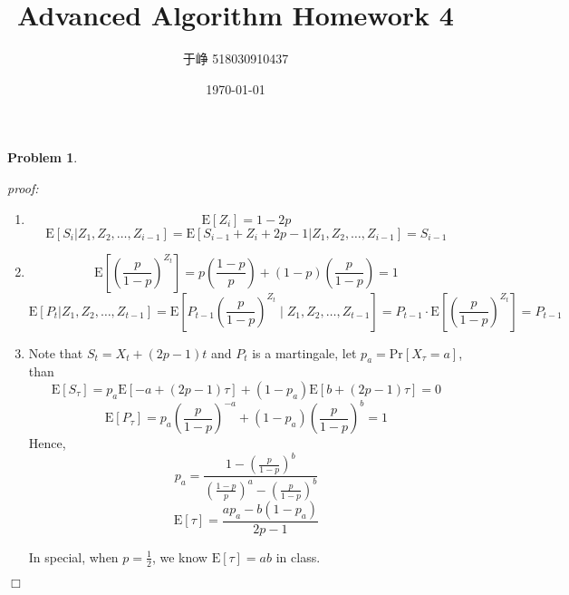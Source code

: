 \documentclass{article}
\title{Advanced Algorithm Homework 4}
\author{于峥 518030910437}
\date{\today}
\newtheorem{problem}[theorem]{Problem}
\newenvironment{solution}{\noindent \textit{proof:}}{$\Box$}
\begin{document}
    \maketitle
    
\begin{problem}
\end{problem}
\begin{solution}
    \begin{enumerate}[1.]
        \item 
        $$
        \mathrm{E}[Z_i] = 1 - 2p
        $$
        $$
        \mathrm{E}[S_i|Z_1,Z_2,\dots,Z_{i-1}] = \mathrm{E}[S_{i-1}+Z_i+2p-1|Z_1,Z_2,\dots,Z_{i-1}]=S_{i-1}
        $$
        \item
        $$
        \mathrm{E}\left[\left(\frac p {1-p}\right)^{Z_t}\right] = 
        p(\frac {1-p} {p}) + (1-p)(\frac {p} {1-p}) = 1
        $$
        $$
        \mathrm{E}[P_t|Z_1,Z_2,\dots,Z_{t-1}]=\mathrm{E}\left[P_{t-1}\left(\frac p {1-p}\right)^{Z_t}\mid Z_1,Z_2,\dots, Z_{t-1}\right]= P_{t-1} \cdot \mathrm{E}
        \left[\left(\frac p {1-p}\right)^{Z_t}\right]=P_{t-1}
        $$
        
        \item 
       Note that $S_t = X_t + (2p-1)t$ and $P_t$ is a martingale, let $p_a = \mathrm{Pr}[X_\tau=a]$, than
        $$
        \mathrm{E}[S_{\tau}] = p_a\mathrm{E}[-a+(2p-1)\tau] + (1-p_a)\mathrm{E}[b+(2p-1)\tau] = 0
        $$
        $$
        \mathrm{E}[P_\tau] = p_a \left(\frac {p} {1-p}\right)^{-a} + (1-p_a) \left(\frac {p} {1-p}\right)^{b} = 1
        $$
        Hence, 
        $$
        p_a = \frac {1-(\frac p {1-p})^b} {(\frac {1-p} p)^a-(\frac p {1-p})^b}
        $$
        $$
        \mathrm{E}[\tau] = \frac {ap_a-b(1-p_a)} {2p-1}
        $$
        
        In special, when $p=\frac 1 2$, we know $\mathrm{E}[\tau]=ab$ in class.
    \end{enumerate}
\end{solution}
\end{document}
